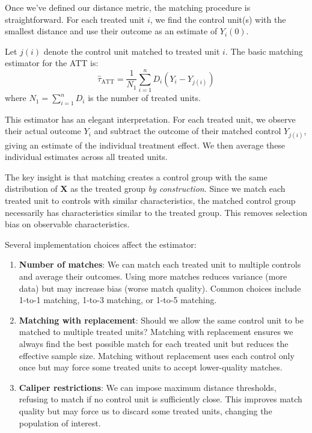 \documentclass[12pt]{article}
\begin{document}
\begin{multicols}{2}
Once we've defined our distance metric, the matching procedure is straightforward.
For each treated unit $i$, we find the control unit(s) with the smallest distance and use their outcome as an estimate of $Y_i(0)$.

Let $j(i)$ denote the control unit matched to treated unit $i$.
The basic matching estimator for the ATT is:
$$\hat{\tau}_{\text{ATT}} = \frac{1}{N_1} \sum_{i=1}^n D_i (Y_i - Y_{j(i)})$$
where $N_1 = \sum_{i=1}^n D_i$ is the number of treated units.

This estimator has an elegant interpretation.
For each treated unit, we observe their actual outcome $Y_i$ and subtract the outcome of their matched control $Y_{j(i)}$, giving an estimate of the individual treatment effect.
We then average these individual estimates across all treated units.

The key insight is that matching creates a control group with the same distribution of $\bm{X}$ as the treated group \emph{by construction}.
Since we match each treated unit to controls with similar characteristics, the matched control group necessarily has characteristics similar to the treated group.
This removes selection bias on observable characteristics.

Several implementation choices affect the estimator:
\begin{enumerate}
  \item \textbf{Number of matches}: We can match each treated unit to multiple controls and average their outcomes.
  Using more matches reduces variance (more data) but may increase bias (worse match quality).
  Common choices include 1-to-1 matching, 1-to-3 matching, or 1-to-5 matching.

  \item \textbf{Matching with replacement}: Should we allow the same control unit to be matched to multiple treated units?
  Matching with replacement ensures we always find the best possible match for each treated unit but reduces the effective sample size.
  Matching without replacement uses each control only once but may force some treated units to accept lower-quality matches.

  \item \textbf{Caliper restrictions}: We can impose maximum distance thresholds, refusing to match if no control unit is sufficiently close.
  This improves match quality but may force us to discard some treated units, changing the population of interest.
\end{enumerate}


\end{multicols}
\end{document}
